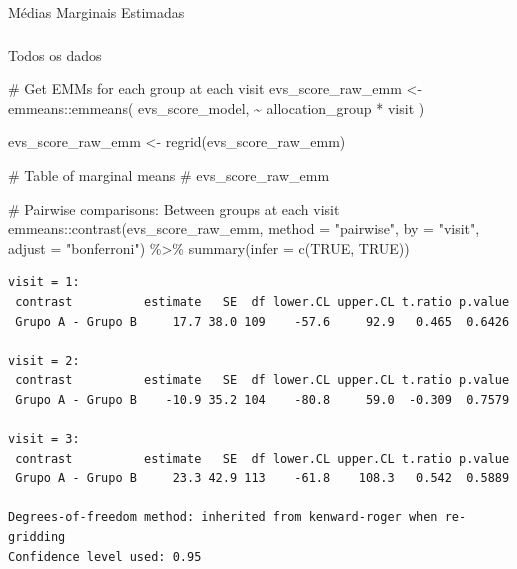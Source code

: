 \documentclass[
  12pt,
]{article}
\makeatletter
\let\oldparagraph\paragraph
\renewcommand{\paragraph}{
    \@ifstar
      \xxxParagraphStar
      \xxxParagraphNoStar
  }
\newcommand{\xxxParagraphStar}[1]{\oldparagraph*{#1}\mbox{}}
\newcommand{\xxxParagraphNoStar}[1]{\oldparagraph{#1}\mbox{}}
\let\oldsubparagraph\subparagraph
\renewcommand{\subparagraph}{
    \@ifstar
      \xxxSubParagraphStar
      \xxxSubParagraphNoStar
  }
\newcommand{\xxxSubParagraphStar}[1]{\oldsubparagraph*{#1}\mbox{}}
\newcommand{\xxxSubParagraphNoStar}[1]{\oldsubparagraph{#1}\mbox{}}
\newenvironment{Shaded}{\begin{snugshade}}{\end{snugshade}}
\newcommand{\AttributeTok}[1]{\textcolor[rgb]{0.40,0.45,0.13}{#1}}
\newcommand{\CommentTok}[1]{\textcolor[rgb]{0.37,0.37,0.37}{#1}}
\newcommand{\ConstantTok}[1]{\textcolor[rgb]{0.56,0.35,0.01}{#1}}
\newcommand{\FunctionTok}[1]{\textcolor[rgb]{0.28,0.35,0.67}{#1}}
\newcommand{\NormalTok}[1]{\textcolor[rgb]{0.00,0.23,0.31}{#1}}
\newcommand{\OtherTok}[1]{\textcolor[rgb]{0.00,0.23,0.31}{#1}}
\newcommand{\SpecialCharTok}[1]{\textcolor[rgb]{0.37,0.37,0.37}{#1}}
\newcommand{\StringTok}[1]{\textcolor[rgb]{0.13,0.47,0.30}{#1}}
\makeatother
\begin{document}
\paragraph{Médias Marginais
Estimadas}\label{muxe9dias-marginais-estimadas-16}

\subparagraph{Todos os dados}\label{todos-os-dados-16}

\begin{Shaded}
\begin{Highlighting}[]
\CommentTok{\# Get EMMs for each group at each visit}
\NormalTok{evs\_score\_raw\_emm }\OtherTok{\textless{}{-}}\NormalTok{ emmeans}\SpecialCharTok{::}\FunctionTok{emmeans}\NormalTok{(}
\NormalTok{    evs\_score\_model, }
    \SpecialCharTok{\textasciitilde{}}\NormalTok{ allocation\_group }\SpecialCharTok{*}\NormalTok{ visit}
\NormalTok{)}

\NormalTok{evs\_score\_raw\_emm }\OtherTok{\textless{}{-}} \FunctionTok{regrid}\NormalTok{(evs\_score\_raw\_emm)}

\CommentTok{\# Table of marginal means}
\CommentTok{\# evs\_score\_raw\_emm}

\CommentTok{\# Pairwise comparisons: Between groups at each visit}
\NormalTok{emmeans}\SpecialCharTok{::}\FunctionTok{contrast}\NormalTok{(evs\_score\_raw\_emm,}
\AttributeTok{method =} \StringTok{"pairwise"}\NormalTok{, }\AttributeTok{by =} \StringTok{"visit"}\NormalTok{,}
\AttributeTok{adjust =} \StringTok{"bonferroni"}\NormalTok{) }\SpecialCharTok{\%\textgreater{}\%} \FunctionTok{summary}\NormalTok{(}\AttributeTok{infer =} \FunctionTok{c}\NormalTok{(}\ConstantTok{TRUE}\NormalTok{, }\ConstantTok{TRUE}\NormalTok{))}
\end{Highlighting}
\end{Shaded}

\begin{verbatim}
visit = 1:
 contrast          estimate   SE  df lower.CL upper.CL t.ratio p.value
 Grupo A - Grupo B     17.7 38.0 109    -57.6     92.9   0.465  0.6426

visit = 2:
 contrast          estimate   SE  df lower.CL upper.CL t.ratio p.value
 Grupo A - Grupo B    -10.9 35.2 104    -80.8     59.0  -0.309  0.7579

visit = 3:
 contrast          estimate   SE  df lower.CL upper.CL t.ratio p.value
 Grupo A - Grupo B     23.3 42.9 113    -61.8    108.3   0.542  0.5889

Degrees-of-freedom method: inherited from kenward-roger when re-gridding 
Confidence level used: 0.95 
\end{verbatim}
\end{document}
